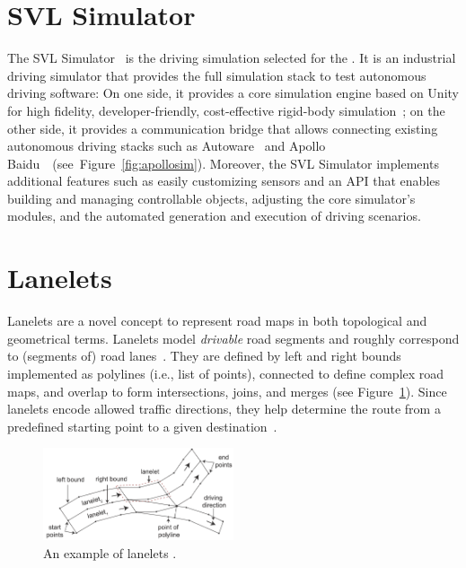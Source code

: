 \documentclass[conference]{IEEEtran}
\begin{document}
\section{SVL Simulator}
\label{subsect:lgsvl}
The SVL Simulator~\cite{rong2020lgsvl} is the driving simulation selected for the \challenge.
It is an industrial driving simulator that provides the full simulation stack to test autonomous driving software: On one side, it provides a core simulation engine based on Unity for high fidelity, developer-friendly, cost-effective rigid-body simulation~\cite{craighead2008using}; on the other side, it provides a communication bridge that allows connecting existing autonomous driving stacks such as Autoware~\cite{DBLP:journals/micro/KatoTINTH15} and Apollo Baidu~\cite{apollo}~(see~Figure~\ref{fig:apollosim}). 
Moreover, the SVL Simulator implements additional features such as easily customizing sensors and an API that enables building and managing controllable objects, adjusting the core simulator's modules, and the automated generation and execution of driving scenarios.


\section{Lanelets}
\label{subsect:lanelets}
Lanelets are a novel concept to represent road maps in both topological and geometrical terms. Lanelets model \emph{drivable} road segments and roughly correspond to (segments of) road lanes~\cite{bender2014lanelets}. They are defined by left and right bounds implemented as polylines (i.e., list of points), connected to define complex road maps, and overlap to form intersections, joins, and merges (see Figure~\ref{fig:lanelets}). Since lanelets encode allowed traffic directions, they help determine the route from a predefined starting point to a given destination~\cite{PekIV20}.

\begin{figure}[tp]
  \centering
    \includegraphics[width=0.5\textwidth]{images/lanelets_01}
  \caption{An example of lanelets \cite{althoff2018automatic}.}
  \label{fig:lanelets}
\end{figure}
\end{document}
